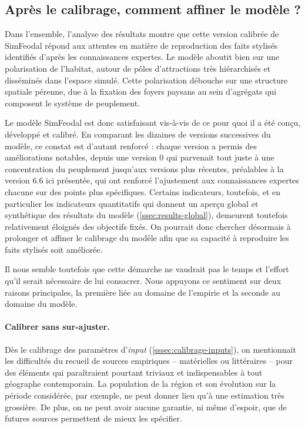\subsection{Après le calibrage, comment affiner le modèle ?}

Dans l'ensemble, l'analyse des résultats montre que cette version calibrée de SimFeodal répond aux attentes en matière de reproduction des faits stylisés identifiés d'après les connaissances expertes.
Le modèle aboutit bien sur une polarisation de l'habitat, autour de pôles d'attractions très hiérarchisés et disséminés dans l'espace simulé.
Cette polarisation débouche sur une structure spatiale pérenne, due à la fixation des foyers paysans au sein d'agrégats qui composent le système de peuplement.

Le modèle SimFeodal est donc satisfaisant vis-à-vis de ce pour quoi il a été conçu, développé et calibré.
En comparant les dizaines de versions successives du modèle, ce constat est d'autant renforcé : chaque version a permis des améliorations notables, depuis une version 0 qui parvenait tout juste à une concentration du peuplement jusqu'aux versions plus récentes, préalables à la version 6.6 ici présentée, qui ont renforcé l'ajustement aux connaissances expertes chacune sur des points plus spécifiques.
Certains indicateurs, toutefois, et en particulier les indicateurs quantitatifs qui donnent un aperçu global et synthétique des résultats du modèle (\cref{ssec:results-global}), demeurent toutefois relativement éloignés des objectifs fixés.
On pourrait donc chercher désormais à prolonger et affiner le calibrage du modèle afin que sa capacité à reproduire les faits stylisés soit améliorée.

Il nous semble toutefois que cette démarche ne vaudrait pas le temps et l'effort qu'il serait nécessaire de lui consacrer.
Nous appuyons ce sentiment sur deux raisons principales, la première liée au domaine de l'empirie et la seconde au domaine du modèle.

\paragraph{Calibrer sans sur-ajuster.}
Dès le calibrage des paramètres d'\textit{input} (\cref{sssec:calibrage-inputs}), on mentionnait les difficultés du recueil de sources empiriques -- matérielles ou littéraires -- pour des éléments qui paraîtraient pourtant triviaux et indispensables à tout géographe contemporain.
La population de la région et son évolution sur la période considérée, par exemple, ne peut donner lieu qu'à une estimation très grossière.
De plus, on ne peut avoir aucune garantie, ni même d'espoir, que de futures sources permettent de mieux les spécifier.

